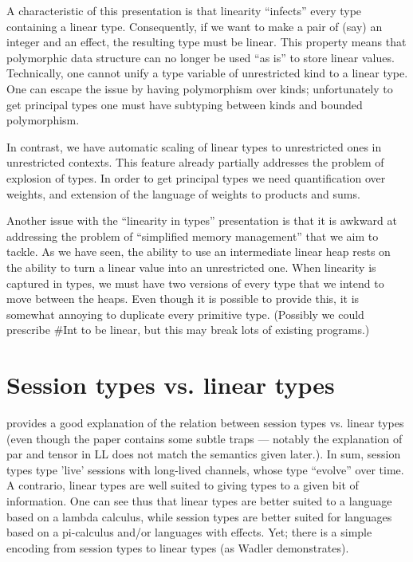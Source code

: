 \documentclass[11pt]{article}
\begin{document}
A characteristic of this presentation is that linearity ``infects''
every type containing a linear type. Consequently, if we want to make
a pair of (say) an integer and an effect, the resulting type must be
linear. This property means that polymorphic data structure can no
longer be used ``as is'' to store linear values. Technically, one
cannot unify a type variable of unrestricted kind to a linear
type. One can escape the issue by having polymorphism over kinds;
unfortunately to get principal types one must have subtyping between
kinds and bounded polymorphism.

In contrast, we have automatic scaling of linear types to unrestricted
ones in unrestricted contexts. This feature already partially
addresses the problem of explosion of types. In order to get principal
types we need quantification over weights, and extension of the
language of weights to products and sums.

Another issue with the ``linearity in types'' presentation is that it
is awkward at addressing the problem of ``simplified memory
management'' that we aim to tackle. As we have seen, the ability to
use an intermediate linear heap rests on the ability to turn a linear
value into an unrestricted one. When linearity is captured in types,
we must have two versions of every type that we intend to move between
the heaps. Even though it is possible to provide this, it is somewhat
annoying to duplicate every primitive type. (Possibly we could
prescribe \#Int to be linear, but this may break lots of existing
programs.)

\section{Session types vs. linear types}

\Textcite{wadler_propositions_2012} provides a good explanation of
the relation between session types vs. linear types (even though the
paper contains some subtle traps --- notably the explanation of par
and tensor in LL does not match the semantics given later.). In sum,
session types type 'live' sessions with long-lived channels, whose
type ``evolve'' over time. A contrario, linear types are well suited
to giving types to a given bit of information. One can see thus that
linear types are better suited to a language based on a lambda
calculus, while session types are better suited for languages based on
a pi-calculus and/or languages with effects. Yet; there is a simple
encoding from session types to linear types (as Wadler demonstrates).


\printbibliography
\end{document}
